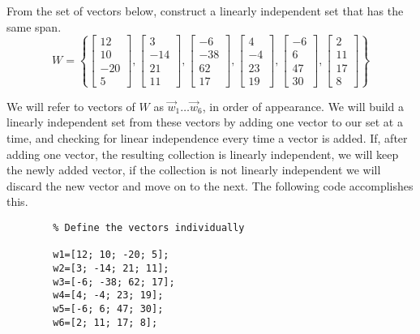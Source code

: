 \documentclass{ximera}
\begin{document}
\begin{example}\label{ex_oct_redundant}
   From the set of vectors below, construct a linearly independent set that has the same span.
    $$W=\left\{\begin{bmatrix}12\\10\\-20\\5\end{bmatrix}, \begin{bmatrix}3\\-14\\21\\11\end{bmatrix},\begin{bmatrix}-6\\-38\\62\\17\end{bmatrix},\begin{bmatrix}4\\-4\\23\\19\end{bmatrix}, \begin{bmatrix}-6\\6\\47\\30\end{bmatrix}, \begin{bmatrix}2\\11\\17\\8\end{bmatrix}\right\}$$
    \begin{explanation}
        We will refer to vectors of $W$ as $\vec{w}_1\dots\vec{w}_6$, in order of appearance.
        We will build a linearly independent set from these vectors by adding one vector to our set at a time, and checking for linear independence every time a vector is added.  If, after adding one vector, the resulting collection is linearly independent, we will keep the newly added vector, if the collection is not linearly independent we will discard the new vector and move on to the next. The following code accomplishes this.

    \begin{verbatim}
        % Define the vectors individually

        w1=[12; 10; -20; 5];
        w2=[3; -14; 21; 11];
        w3=[-6; -38; 62; 17];
        w4=[4; -4; 23; 19];
        w5=[-6; 6; 47; 30];
        w6=[2; 11; 17; 8];


\end{verbatim}
\end{explanation}
\end{example}
\end{document}
